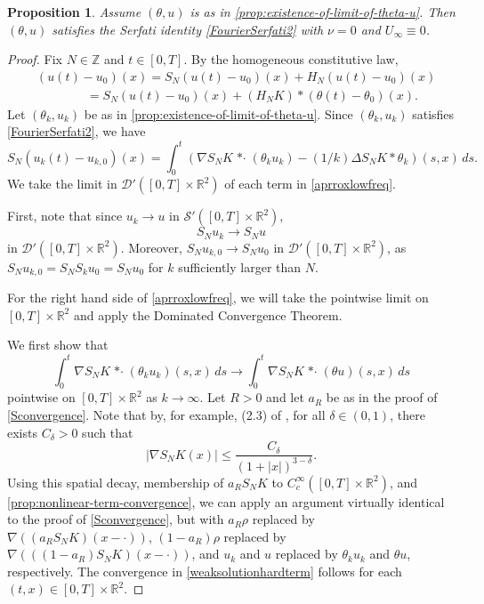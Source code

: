 \documentclass[11pt,reqno,xcolor=svgnames]{amsart}
\def\R{{\mathbb R}}
\def\Z{{\mathbb Z}}
\theoremstyle{plain}
\newtheorem{prop}[theorem]{Proposition}
\theoremstyle{definition}
\theoremstyle{plain}
\theoremstyle{remark}
\newcommand{\iny}{\ensuremath{\infty}}
\newcommand{\stardot}{{\mathop{* \cdot}}}
\begin{document}
\begin{prop}\label{P:InviscidSerfatiID}
    Assume $(\theta,u)$ is as in \cref{prop:existence-of-limit-of-theta-u}.  Then $(\theta,u)$ satisfies the Serfati identity \cref{FourierSerfati2} with $\nu=0$ and $U_\iny \equiv 0$.
\end{prop}
\begin{proof}
Fix $N\in\Z$ and $t\in [0,T]$.  By the homogeneous constitutive law,
\begin{equation} \label{lowhigh}
\begin{split}
&(u(t) - u_0)(x) = S_N(u(t) - u_0)(x) + H_N(u(t) - u_0)(x)\\
&\qquad\qquad = S_N(u(t) - u_0)(x) + (H_NK)\ast (\theta(t) - \theta_0)(x).
\end{split}
\end{equation}
Let $(\theta_k,u_k)$ be as in \cref{prop:existence-of-limit-of-theta-u}.  Since $(\theta_k,u_k)$ satisfies \cref{FourierSerfati2}, we have
\begin{equation}\label{aprroxlowfreq}
S_N(u_k(t) - u_{k,0})(x) = \int_0^t ( \nabla S_{N}K\stardot (\theta_ku_k) - (1/k) \Delta S_N K \ast \theta_k  )(s,x)  \, ds.
\end{equation}
We take the limit in $\mathcal{D}'([0,T]\times\R^2)$ of each term in \cref{aprroxlowfreq}.

First, note that since $u_k\rightarrow u$ in $\mathcal{S}'([0,T]\times\R^2)$, 
\begin{equation}\label{pwlimit}
S_N u_k \rightarrow S_N u
\end{equation} in $\mathcal{D}'([0,T]\times\R^2)$.  Moreover, $S_Nu_{k,0} \rightarrow S_Nu_0$ in $\mathcal{D}'([0,T]\times\R^2)$, as $S_Nu_{k,0} = S_NS_ku_{0} = S_Nu_0 $ for $k$ sufficiently larger than $N$.  






For the right hand side of \cref{aprroxlowfreq}, we will take the pointwise limit on $[0,T]\times\R^2$ and apply the Dominated Convergence Theorem. 

We first show that 
\begin{equation}\label{weaksolutionhardterm}
 \int_0^t  \nabla S_{N}K\stardot (\theta_ku_k)(s,x)  \, ds  \rightarrow  \int_0^t   \nabla S_{N}K\stardot(\theta u)(s,x) \, ds 
\end{equation}
pointwise on $[0,T]\times \R^2$ as $k\rightarrow\infty$.  Let $R>0$ and let $a_R$ be as in the proof of \cref{Sconvergence}.  Note that by, for example, (2.3) of \cite{Cozzi}, for all $\delta\in (0,1)$, there exists $C_{\delta}>0$ such that
$$ |\nabla S_N K(x)| \leq \frac{C_{\delta}}{(1+|x|)^{3-\delta}}.$$  Using this spatial decay, membership of $a_RS_NK$ to $C^{\infty}_c([0,T]\times\R^2)$, and \cref{prop:nonlinear-term-convergence}, we can apply an argument virtually identical to the proof of \cref{Sconvergence}, but with $a_R\rho$ replaced by $\nabla((a_R S_N K)(x-\cdot))$, $(1-a_R)\rho$ replaced by $\nabla(((1-a_R) S_N K)(x-\cdot))$, and $u_k$ and $u$ replaced by $\theta_ku_k$ and $\theta u$, respectively.  The convergence in \cref{weaksolutionhardterm} follows for each $(t,x)\in [0,T]\times\R^2$.     


\end{proof}
\end{document}
